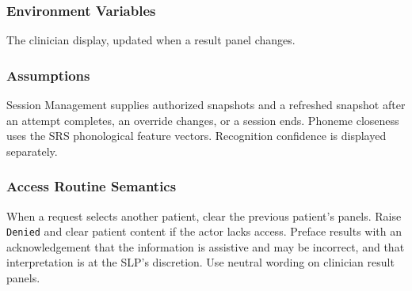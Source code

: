 \documentclass[12pt, titlepage]{article}
\begin{document}
\subsubsection{Environment Variables}
The clinician display, updated when a result panel changes.

\subsubsection{Assumptions}
Session Management supplies authorized snapshots and a refreshed snapshot
after an attempt completes, an override changes, or a session ends.
Phoneme closeness uses the SRS phonological feature vectors. Recognition
confidence is displayed separately.

\subsubsection{Access Routine Semantics}
When a request selects another patient, clear the previous patient's panels.
Raise \texttt{Denied} and clear patient content if the actor lacks access.
Preface results with an acknowledgement that the information is assistive
and may be incorrect, and that interpretation is at the SLP's discretion.
Use neutral wording on clinician result panels.
\end{document}
